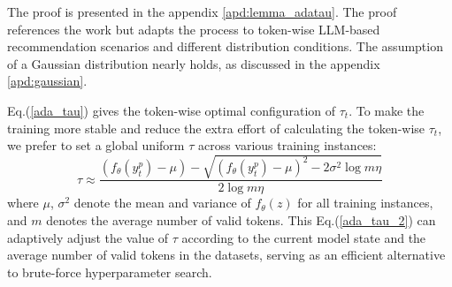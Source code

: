 \documentclass[sigconf,natbib=true]{acmart}
\begin{document}



The proof is presented in the appendix \ref{apd:lemma_adatau}. The proof references the work \cite{chen2023adap} but adapts the process to token-wise LLM-based recommendation scenarios and different distribution conditions. The assumption of a Gaussian distribution nearly holds, as discussed in the appendix \ref{apd:gaussian}.

Eq.(\ref{ada_tau}) gives the token-wise optimal configuration of $\tau_t$. To make the training more stable and reduce the extra effort of calculating the token-wise $\tau_t$, we prefer to set a global uniform $\tau$ across various training instances:
\begin{equation}
\label{ada_tau_2}
\tau \approx \frac{(f_\theta(y_t^p) - \mu)-\sqrt{(f_\theta(y_t^p) - \mu)^2-2 \sigma^2 \log m \eta }}{2\log m \eta}
\end{equation}
where $\mu$, $\sigma^2$ denote the mean and variance of $f_\theta(z)$ for all training instances, and $m$ denotes the average number of valid tokens. This Eq.(\ref{ada_tau_2}) can adaptively adjust the value of $\tau$ according to the current model state and the average number of valid tokens in the datasets, serving as an efficient alternative to brute-force hyperparameter search.







\end{document}
